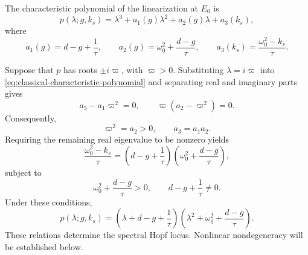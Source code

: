 \documentclass[11pt,reqno]{amsart}
\theoremstyle{plain}
\theoremstyle{definition}
\theoremstyle{remark}
\begin{document}

The characteristic polynomial of the linearization at $E_0$ is
\begin{equation}
\label{eq:classical-characteristic-polynomial}
p(\lambda;g,k_s)
=
\lambda^3+a_1(g)\lambda^2+a_2(g)\lambda+a_3(k_s),
\end{equation}
where
\begin{equation}
\label{eq:classical-cubic-coefficients}
a_1(g)=d-g+\frac1\tau,\qquad
a_2(g)=\omega_0^2+\frac{d-g}{\tau},\qquad
a_3(k_s)=\frac{\omega_0^2-k_s}{\tau}.
\end{equation}

Suppose that $p$ has roots $\pm i\varpi$, with $\varpi>0$.
Substituting $\lambda=i\varpi$ into
\eqref{eq:classical-characteristic-polynomial} and separating real
and imaginary parts gives
\[
a_3-a_1\varpi^2=0,\qquad
\varpi(a_2-\varpi^2)=0.
\]
Consequently,
\[
\varpi^2=a_2>0,\qquad a_3=a_1a_2.
\]
Requiring the remaining real eigenvalue to be nonzero yields
\begin{equation}
\label{eq:classical-Hopf-locus-original}
\frac{\omega_0^2-k_s}{\tau}
=
\left(d-g+\frac1\tau\right)
\left(\omega_0^2+\frac{d-g}{\tau}\right),
\end{equation}
subject to
\begin{equation}
\label{eq:classical-Hopf-basic-conditions}
\omega_0^2+\frac{d-g}{\tau}>0,
\qquad
d-g+\frac1\tau\neq0.
\end{equation}
Under these conditions,
\begin{equation}
\label{eq:classical-Hopf-factorization-general}
p(\lambda;g,k_s)
=
\left(\lambda+d-g+\frac1\tau\right)
\left(\lambda^2+\omega_0^2+\frac{d-g}{\tau}\right).
\end{equation}
These relations determine the spectral Hopf locus. Nonlinear
nondegeneracy will be established below.

\end{document}
